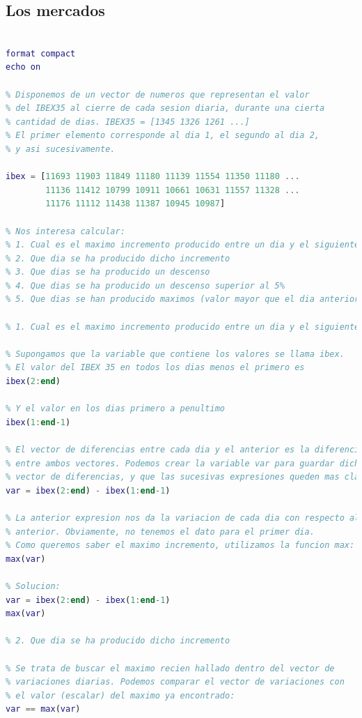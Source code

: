 \subsection{Los mercados}
\begin{lstlisting}[language=Matlab]
% Ejercicio 18. La bolsa

format compact
echo on

% Disponemos de un vector de numeros que representan el valor
% del IBEX35 al cierre de cada sesion diaria, durante una cierta
% cantidad de dias. IBEX35 = [1345 1326 1261 ...]
% El primer elemento corresponde al dia 1, el segundo al dia 2,
% y asi sucesivamente.

ibex = [11693 11903 11849 11180 11139 11554 11350 11180 ...
        11136 11412 10799 10911 10661 10631 11557 11328 ...
        11176 11112 11438 11387 10945 10987]

% Nos interesa calcular:
% 1. Cual es el maximo incremento producido entre un dia y el siguiente
% 2. Que dia se ha producido dicho incremento
% 3. Que dias se ha producido un descenso
% 4. Que dias se ha producido un descenso superior al 5%
% 5. Que dias se han producido maximos (valor mayor que el dia anterior

% 1. Cual es el maximo incremento producido entre un dia y el siguiente

% Supongamos que la variable que contiene los valores se llama ibex.
% El valor del IBEX 35 en todos los dias menos el primero es
ibex(2:end)

% Y el valor en los dias primero a penultimo
ibex(1:end-1)

% El vector de diferencias entre cada dia y el anterior es la diferencia
% entre ambos vectores. Podemos crear la variable var para guardar dicho
% vector de diferencias, y que las sucesivas expresiones queden mas claras:
var = ibex(2:end) - ibex(1:end-1)

% La anterior expresion nos da la variacion de cada dia con respecto al
% anterior. Obviamente, no tenemos el dato para el primer dia.
% Como queremos saber el maximo incremento, utilizamos la funcion max:
max(var)

% Solucion:
var = ibex(2:end) - ibex(1:end-1)
max(var)

% 2. Que dia se ha producido dicho incremento

% Se trata de buscar el maximo recien hallado dentro del vector de
% variaciones diarias. Podemos comparar el vector de variaciones con
% el valor (escalar) del maximo ya encontrado:
var == max(var)


\end{lstlisting}
